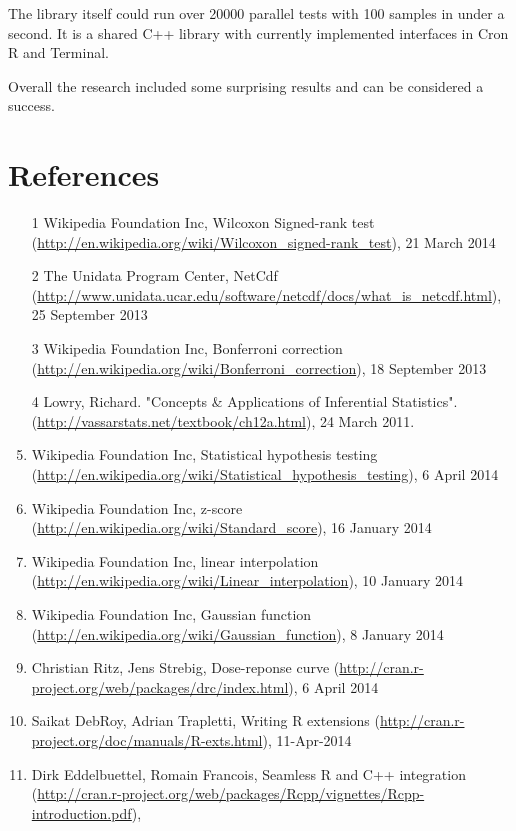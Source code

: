\documentclass[12pt]{article}
\begin{document}
The library itself could run over 20000 parallel tests with 100 samples in under a second. It is a shared C++ library with currently implemented interfaces in Cron R and Terminal.

Overall the research included some surprising results and can be considered a success.

\newpage

\section{References}
\begin{enumerate}
\item
[1] Wikipedia Foundation Inc, Wilcoxon Signed-rank test (\url{http://en.wikipedia.org/wiki/Wilcoxon_signed-rank_test}),  21 March 2014
\item
[2] The Unidata Program Center, NetCdf (\url{http://www.unidata.ucar.edu/software/netcdf/docs/what_is_netcdf.html}), 25 September 2013
\item
[3] Wikipedia Foundation Inc, Bonferroni correction (\url{http://en.wikipedia.org/wiki/Bonferroni_correction}), 18 September 2013
\item
[4]  Lowry, Richard. "Concepts \& Applications of Inferential Statistics". (\url{http://vassarstats.net/textbook/ch12a.html}), 24 March 2011.
\item Wikipedia Foundation Inc, Statistical hypothesis testing (\url{http://en.wikipedia.org/wiki/Statistical_hypothesis_testing}), 6 April 2014
\item Wikipedia Foundation Inc, z-score (\url{http://en.wikipedia.org/wiki/Standard_score}), 16 January 2014
\item Wikipedia Foundation Inc, linear interpolation (\url{http://en.wikipedia.org/wiki/Linear_interpolation}), 10 January 2014
\item Wikipedia Foundation Inc, Gaussian function (\url{http://en.wikipedia.org/wiki/Gaussian_function}), 8 January 2014
\item Christian Ritz, Jens Strebig, Dose-reponse curve (\url{http://cran.r-project.org/web/packages/drc/index.html}), 6 April 2014
\item Saikat DebRoy, Adrian Trapletti, Writing R extensions (\url{http://cran.r-project.org/doc/manuals/R-exts.html}), 11-Apr-2014
\item Dirk Eddelbuettel, Romain Francois, Seamless R and C++ integration (\url{http://cran.r-project.org/web/packages/Rcpp/vignettes/Rcpp-introduction.pdf}),
\end{enumerate}
\end{document}
